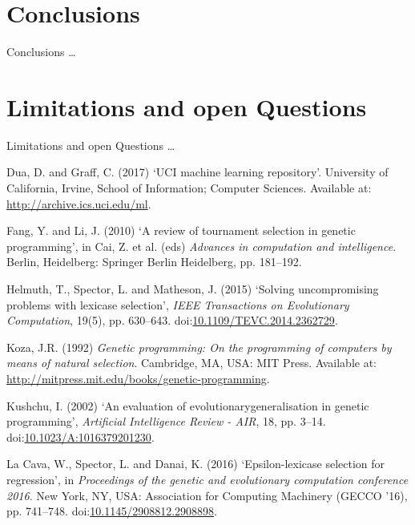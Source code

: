 \documentclass[
  ignorenonframetext,
]{beamer}
\newenvironment{cslreferences}%
  {}%
  {\par}
\begin{document}
\hypertarget{conclusions}{%
\section{Conclusions}\label{conclusions}}

\begin{frame}{Conclusions}
\ldots{}
\end{frame}

\hypertarget{limitations-and-open-questions}{%
\section{Limitations and open
Questions}\label{limitations-and-open-questions}}

\begin{frame}{Limitations and open Questions}
\ldots{} \newpage  

\hypertarget{refs}{}
\begin{cslreferences}
\leavevmode\hypertarget{ref-Dua:2019}{}%
Dua, D. and Graff, C. (2017) `UCI machine learning repository'.
University of California, Irvine, School of Information; Computer
Sciences. Available at: \url{http://archive.ics.uci.edu/ml}.

\leavevmode\hypertarget{ref-10.1007ux2f978-3-642-16493-4_19}{}%
Fang, Y. and Li, J. (2010) `A review of tournament selection in genetic
programming', in Cai, Z. et al. (eds) \emph{Advances in computation and
intelligence}. Berlin, Heidelberg: Springer Berlin Heidelberg, pp.
181--192.

\leavevmode\hypertarget{ref-6920034}{}%
Helmuth, T., Spector, L. and Matheson, J. (2015) `Solving uncompromising
problems with lexicase selection', \emph{IEEE Transactions on
Evolutionary Computation}, 19(5), pp. 630--643.
doi:\href{https://doi.org/10.1109/TEVC.2014.2362729}{10.1109/TEVC.2014.2362729}.

\leavevmode\hypertarget{ref-koza_main}{}%
Koza, J.R. (1992) \emph{Genetic programming: On the programming of
computers by means of natural selection}. Cambridge, MA, USA: MIT Press.
Available at: \url{http://mitpress.mit.edu/books/genetic-programming}.

\leavevmode\hypertarget{ref-generalisation_in_gp}{}%
Kushchu, I. (2002) `An evaluation of evolutionarygeneralisation in
genetic programming', \emph{Artificial Intelligence Review - AIR}, 18,
pp. 3--14.
doi:\href{https://doi.org/10.1023/A:1016379201230}{10.1023/A:1016379201230}.

\leavevmode\hypertarget{ref-epsilon_lexicase_main}{}%
La Cava, W., Spector, L. and Danai, K. (2016) `Epsilon-lexicase
selection for regression', in \emph{Proceedings of the genetic and
evolutionary computation conference 2016}. New York, NY, USA:
Association for Computing Machinery (GECCO '16), pp. 741--748.
doi:\href{https://doi.org/10.1145/2908812.2908898}{10.1145/2908812.2908898}.


\end{cslreferences}
\end{frame}
\end{document}
